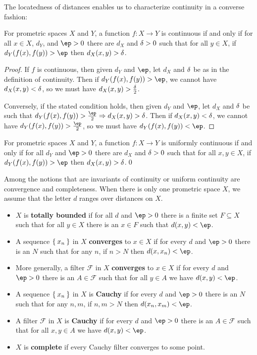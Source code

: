 \documentclass{article}
\def\F{\mathcal{F}}
\let\implies\Rightarrow
\def\hfep{\frac{\ep}{2}}
\begin{document}
The locatedness of distances enables us to characterize continuity in a converse fashion:

\begin{lem}\label{thm:cocontinuous}
  For prometric spaces $X$ and $Y$, a function $f:X\to Y$ is continuous if and only if for all $x\in X$, $d_Y$, and $\ep>0$ there are $d_X$ and $\delta>0$ such that for all $y\in X$, if $d_Y(f(x),f(y))>\ep$ then $d_X(x,y)>\delta$.
\end{lem}
\begin{proof}
  If $f$ is continuous, then given $d_Y$ and $\ep$, let $d_X$ and $\delta$ be as in the definition of continuity.
  Then if $d_Y(f(x),f(y)) > \ep$, we cannot have $d_X(x,y) < \delta$, so we must have $d_X(x,y) > \frac{\delta}{2}$.

  Conversely, if the stated condition holds, then given $d_Y$ and $\ep$, let $d_X$ and $\delta$ be such that $d_Y(f(x),f(y))>\hfep \implies d_X(x,y)>\de$.
  Then if $d_X(x,y)<\delta$, we cannot have $d_Y(f(x),f(y))>\hfep$, so we must have $d_Y(f(x),f(y))<\ep$.
\end{proof}

\begin{lem}\label{thm:unif-cocontinuous}
  For prometric spaces $X$ and $Y$, a function $f:X\to Y$ is uniformly continuous if and only if for all $d_Y$ and $\ep>0$ there are $d_X$ and $\delta>0$ such that for all $x,y\in X$, if $d_Y(f(x),f(y))>\ep$ then $d_X(x,y)>\delta$.\qed
\end{lem}

Among the notions that are invariants of continuity or uniform continuity are convergence and completeness.
When there is only one prometric space $X$, we assume that the letter $d$ ranges over distances on $X$.

\begin{itemize}
\item $X$ is \textbf{totally bounded} if for all $d$ and $\ep>0$ there is a finite set $F\subseteq X$ such that for all $y\in X$ there is an $x\in F$ such that $d(x,y)<\ep$.
\item A sequence $\Set{x_n}$ in $X$ \textbf{converges} to $x\in X$ if for every $d$ and $\ep>0$ there is an $N$ such that for any $n$, if $n>N$ then $d(x,x_n)<\ep$.
\item More generally, a filter $\F$ in $X$ \textbf{converges} to $x\in X$ if for every $d$ and $\ep>0$ there is an $A\in\F$ such that for all $y\in A$ we have $d(x,y)<\ep$.
\item A sequence $\Set{x_n}$ in $X$ is \textbf{Cauchy} if for every $d$ and $\ep>0$ there is an $N$ such that for any $n,m$, if $n,m>N$ then $d(x_n,x_m)<\ep$.
\item A filter $\F$ in $X$ is \textbf{Cauchy} if for every $d$ and $\ep>0$ there is an $A\in\F$ such that for all $x,y\in A$ we have $d(x,y)<\ep$.
\item $X$ is \textbf{complete} if every Cauchy filter converges to some point.
\end{itemize}
\end{document}
